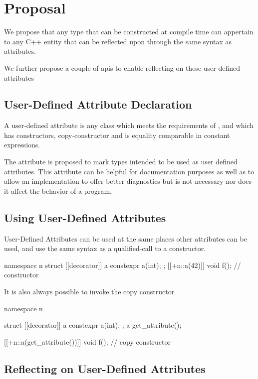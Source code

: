 \documentclass{wg21}
\begin{document}
\section{Proposal}

We propose that any  type that can be constructed at compile time can appertain to any C++ entity that can be reflected upon through the same syntax as attributes.

We further propose a couple of apis to enable reflecting on these user-defined attributes

\subsection{User-Defined Attribute Declaration}

A user-defined attribute is any class which meets the requirements of , and which has 
constructors, copy-constructor and is equality comparable in constant expressions.

The \tcode{[[decorator]]} attribute is proposed to mark types intended to be used as user defined attributes.
This attribute can be helpful for documentation purposes as well as to allow an implementation to offer better diagnostics but is not necessary nor does it affect the behavior of a program.

\subsection{Using User-Defined Attributes}

User-Defined Attributes can be used at the same places other attributes can be used,
and use the same syntax as a qualified-call to a constructor.

\begin{colorblock}
namespace n {
    struct [[decorator]] a {
        constexpr a(int);
    };
    [[+n::a(42)]] void f(); // constructor
}
\end{colorblock}

It is also always possible to invoke the copy constructor


\begin{colorblock}
namespace n {
    struct [[decorator]] a {
        constexpr a(int);
    };
    a get_attribute();
    
    [[+n::a(get_attribute())]] void f(); // copy constructor
}
\end{colorblock}


\subsection{Reflecting on User-Defined Attributes}
\end{document}
